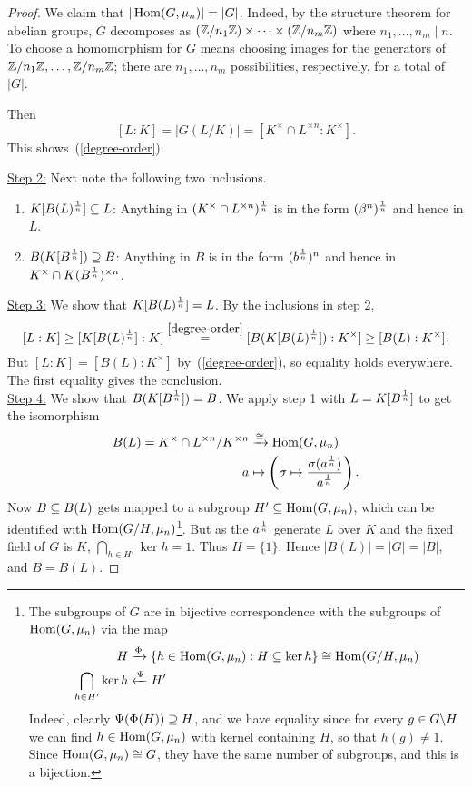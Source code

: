 \begin{proof}
We claim that $|\operatorname{Hom}(G,\mu_n)|=|G|$. Indeed, by the structure theorem for abelian groups, $G$ decomposes as $(\mathbb{Z}/n_1\mathbb{Z})\times \cdots \times (\mathbb{Z}/n_m\mathbb{Z})$ where $n_1,\ldots, n_m\mid n$. To choose a homomorphism for $G$ means choosing images for the generators of $\mathbb{Z}/n_1\mathbb{Z},\ldots, \mathbb{Z}/n_m\mathbb{Z}$; there are $n_1,\ldots, n_m$ possibilities, respectively, for a total of $|G|$.

Then
\[
[L:K]=|G(L/K)|=[K^{\times}\cap L^{\times n}:K^{\times}].
\]
This shows~(\ref{degree-order}).

\noindent\underline{Step 2:} Next note the following two inclusions.
\begin{enumerate}
\item
$K[B(L)^{\frac{1}{n}}]\subseteq L$: Anything in $(K^{\times}\cap L^{\times n})^{\frac{1}{n}}$ is in the form $(\beta^n)^{\frac{1}{n}}$ and hence in $L$.
\item
$B(K[B^{\frac{1}{n}}])\supseteq B$: Anything in $B$ is in the form $(b^{\frac{1}{n}})^n$ and hence in $K^{\times}\cap K(B^{\frac{1}{n}})^{\times n}$.
\end{enumerate}

\noindent\underline{Step 3:} We show that $K[B(L)^{\frac{1}{n}}]= L$. By the inclusions in step 2,
\[
[L:K]\ge [K[B(L)^{\frac{1}{n}}]:K]\stackrel{\eqref{degree-order}}{=}
[B(K[B(L)^{\frac{1}{n}}]):K^{\times}]\ge [B(L):K^{\times}].
\]
But $[L:K]=[B(L):K^{\times}]$ by~(\ref{degree-order}), so equality holds everywhere. The first equality gives the conclusion.\\

\noindent\underline{Step 4:} We show that $B(K[B^{\frac{1}{n}}])= B$. We apply step 1 with $L=K[B^{\frac{1}{n}}]$ to get the isomorphism
\begin{align*}
B(L)=K^{\times}\cap L^{\times n}/K^{\times n}&\xrightarrow{\cong} \operatorname{Hom}(G,\mu_n)\\
a&\mapsto \left( {\sigma\mapsto \frac{\sigma(a^{\frac{1}{n}})}{a^{\frac{1}{n}}}} \right).
\end{align*}
Now $B\subseteq B(L)$ gets mapped to a subgroup $H'\subseteq \operatorname{Hom}(G,\mu_n)$, which can be identified with $\operatorname{Hom}(G/H,\mu_n)$\footnote{
The subgroups of $G$ are in bijective correspondence with the subgroups of $\operatorname{Hom}(G,\mu_n)$ via the map
\begin{align*}
H&\xrightarrow{\Phi} \left\{{h\in \operatorname{Hom}(G,\mu_n)}:{H\subseteq \ker h}\right\}\cong \operatorname{Hom}(G/H,\mu_n)\\
\bigcap_{h\in H'} \ker h&\xleftarrow{\Psi} H'
\end{align*}
Indeed, clearly $\Psi(\Phi(H))\supseteq H$, and we have equality since for every $g\in G\backslash H$ we can find $h\in \operatorname{Hom}(G,\mu_n)$ with kernel containing $H$, so that $h(g)\ne 1$. Since $\operatorname{Hom}(G,\mu_n)\cong G$, they have the same number of subgroups, and this is a bijection.
}.
But as the $a^{\frac{1}{n}}$ generate $L$ over $K$ and the fixed field of $G$ is $K$, $\bigcap_{h\in H'} \ker h=1$. Thus $H=\{1\}$.
Hence $|B(L)|=|G|=|B|$, and $B=B(L)$.
\end{proof}
